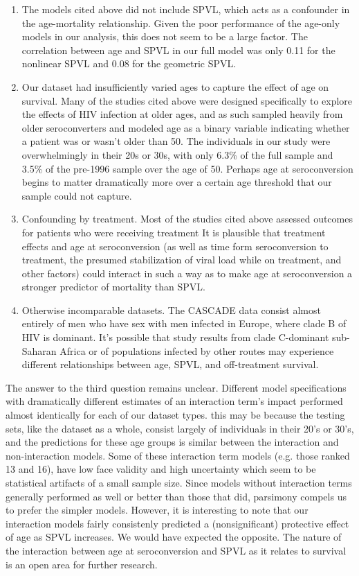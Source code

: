 \documentclass[12pt, titlepage, proquest]{article}
\begin{document}
\begin{enumerate}
	\item The models cited above did not include SPVL, which acts as a confounder in the age-mortality relationship. Given the poor performance of the age-only models in our analysis, this does not seem to be a large factor. The correlation between age and SPVL in our full model was only 0.11 for the nonlinear SPVL and 0.08 for the geometric SPVL. 

	\item Our dataset had insufficiently varied ages to capture the effect of age on survival. Many of the studies cited above were designed specifically to explore the effects of HIV infection at older ages, and as such sampled heavily from older seroconverters and modeled age as a binary variable indicating whether a patient was or wasn't older than 50. The individuals in our study were overwhelmingly in their 20s or 30s, with only 6.3\% of the full sample and 3.5\% of the pre-1996 sample over the age of 50. Perhaps age at seroconversion begins to matter dramatically more over a certain age threshold that our sample could not capture.

	\item Confounding by treatment. Most of the studies cited above assessed outcomes for patients who were receiving treatment It is plausible that treatment effects and age at seroconversion (as well as time form seroconversion to treatment, the presumed stabilization of viral load while on treatment, and other factors) could interact in such a way as to make age at seroconversion a stronger predictor of mortality than SPVL. 

	\item Otherwise incomparable datasets. The CASCADE data consist almost entirely of men who have sex with men infected in Europe, where clade B of HIV is dominant. It's possible that study results from clade C-dominant sub-Saharan Africa or of populations infected by other routes may experience different relationships between age, SPVL, and off-treatment survival.
\end{enumerate}

The answer to the third question remains unclear. Different model specifications with dramatically different estimates of an interaction term's impact performed almost identically for each of our dataset types. this may be because the testing sets, like the dataset as a whole, consist largely of individuals in their 20's or 30's, and the predictions for these age groups is similar between the interaction and non-interaction models. Some of these interaction term models (e.g. those ranked 13 and 16), have low face validity and high uncertainty which seem to be statistical artifacts of a small sample size. Since models without interaction terms generally performed as well or better than those that did, parsimony compels us to prefer the simpler models. However, it is interesting to note that our interaction models fairly consistenly predicted a (nonsignificant) protective effect of age as SPVL increases. We would have expected the opposite. The nature of the interaction between age at seroconversion and SPVL as it relates to survival is an open area for further research. 
\end{document}
